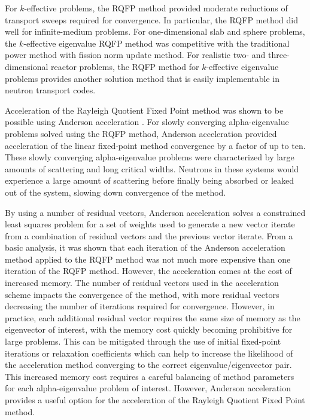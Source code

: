 For $k$-effective problems, the RQFP method provided moderate reductions of transport sweeps required for convergence. In particular, the RQFP method did well for infinite-medium problems. For one-dimensional slab and sphere problems, the $k$-effective eigenvalue RQFP method was competitive with the traditional power method with fission norm update method. For realistic two- and three-dimensional reactor problems, the RQFP method for $k$-effective eigenvalue problems provides another solution method that is easily implementable in neutron transport codes.

Acceleration of the Rayleigh Quotient Fixed Point method was shown to be possible using Anderson acceleration \cite{walker_anderson_2011}. For slowly converging alpha-eigenvalue problems solved using the RQFP method, Anderson acceleration provided acceleration of the linear fixed-point method convergence by a factor of up to ten. These slowly converging alpha-eigenvalue problems were characterized by large amounts of scattering and long critical widths. Neutrons in these systems would experience a large amount of scattering before finally being absorbed or leaked out of the system, slowing down convergence of the method.

By using a number of residual vectors, Anderson acceleration solves a constrained least squares problem for a set of weights used to generate a new vector iterate from a combination of residual vectors and the previous vector iterate. From a basic analysis, it was shown that each iteration of the Anderson acceleration method applied to the RQFP method was not much more expensive than one iteration of the RQFP method. However, the acceleration comes at the cost of increased memory.  The number of residual vectors used in the acceleration scheme impacts the convergence of the method, with more residual vectors decreasing the number of iterations required for convergence. However, in practice, each additional residual vector requires the same size of memory as the eigenvector of interest, with the memory cost quickly becoming prohibitive for large problems. This can be mitigated through the use of initial fixed-point iterations or relaxation coefficients which can help to increase the likelihood of the acceleration method converging to the correct eigenvalue/eigenvector pair. This increased memory cost requires a careful balancing of method parameters for each alpha-eigenvalue problem of interest. However, Anderson acceleration provides a useful option for the acceleration of the Rayleigh Quotient Fixed Point method.

